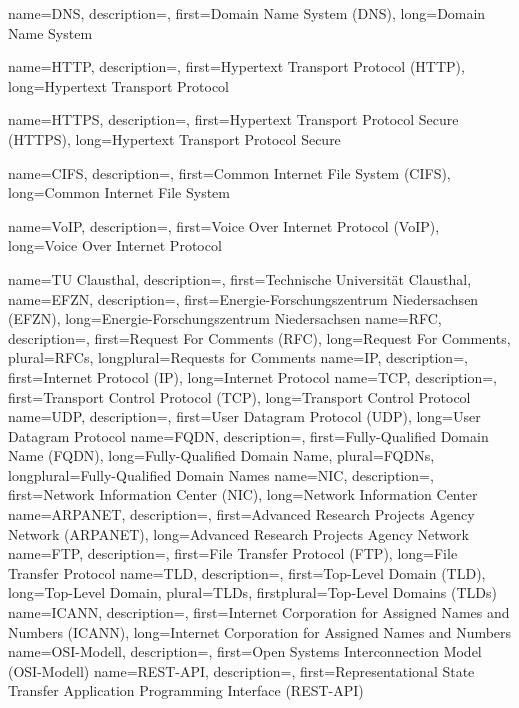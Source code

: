 {%
    name={DNS},
    description={},
    first={Domain Name System (DNS)},
    long={Domain Name System}
}

{%
    name={HTTP},
    description={},
    first={Hypertext Transport Protocol (HTTP)},
    long={Hypertext Transport Protocol}

}
{%
    name={HTTPS},
    description={},
    first={Hypertext Transport Protocol Secure (HTTPS)},
    long={Hypertext Transport Protocol Secure}

}
{%
    name={CIFS},
    description={},
    first={Common Internet File System (CIFS)},
    long={Common Internet File System}

}
{%
    name={VoIP},
    description={},
    first={Voice Over Internet Protocol (VoIP)},
    long={Voice Over Internet Protocol}

}
{%
    name={TU Clausthal},
    description={},
    first={Technische Universität Clausthal},
}
{%
    name={EFZN},
    description={},
    first={Energie-Forschungszentrum Niedersachsen (EFZN)},
    long={Energie-Forschungszentrum Niedersachsen}
}
{%
    name={RFC},
    description={},
    first={Request For Comments (RFC)},
    long={Request For Comments},
    plural={RFCs},
    longplural={Requests for Comments}
}
{%
    name={IP},
    description={},
    first={Internet Protocol (IP)},
    long={Internet Protocol}
}
{%
    name={TCP},
    description={},
    first={Transport Control Protocol (TCP)},
    long={Transport Control Protocol}
}
{%
    name={UDP},
    description={},
    first={User Datagram Protocol (UDP)},
    long={User Datagram Protocol}
}
{%
    name={FQDN},
    description={},
    first={Fully-Qualified Domain Name (FQDN)},
    long={Fully-Qualified Domain Name},
    plural={FQDNs},
    longplural={Fully-Qualified Domain Names}
}
{%
    name={NIC},
    description={},
    first={Network Information Center (NIC)},
    long={Network Information Center}
}
{%
    name={ARPANET},
    description={},
    first={Advanced Research Projects Agency Network (ARPANET)},
    long={Advanced Research Projects Agency Network}
}
{%
    name={FTP},
    description={},
    first={File Transfer Protocol (FTP)},
    long={File Transfer Protocol}
}
{%
    name={TLD},
    description={},
    first={Top-Level Domain (TLD)},
    long={Top-Level Domain},
    plural={TLDs},
    firstplural={Top-Level Domains (TLDs)}
}
{%
    name={ICANN},
    description={},
    first={Internet Corporation for Assigned Names and Numbers (ICANN)},
    long={Internet Corporation for Assigned Names and Numbers}
}
{%
    name={OSI-Modell},
    description={},
    first={Open Systems Interconnection Model (OSI-Modell)}
}
{%
    name={REST-API},
    description={},
    first={Representational State Transfer Application Programming Interface (REST-API)}
}
